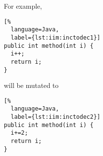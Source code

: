 For example, \newline
\begin{lstlisting}[%
  language=Java,
  label={lst:iim:inctodec1}]
public int method(int i) {
  i++;
  return i;
}
\end{lstlisting}

will be mutated to \newline

\begin{lstlisting}[%
  language=Java,
  label={lst:iim:inctodec2}]
public int method(int i) {
  i+=2;
  return i;
}
\end{lstlisting}

